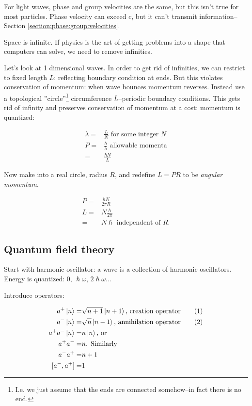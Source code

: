 \documentclass[]{article}
\newcommand\numberthis{\addtocounter{equation}{1}\tag{\theequation}}
\begin{document}
For light waves, phase and group velocities are the same, but this isn't true for most particles. Phase velocity can exceed $c$, but it can't transmit information--Section \ref{section:phase:group:velocities}.

Space is infinite. If physics is the art of getting problems into a shape that computers can solve, we need to remove infinities.

Let's look at 1 dimensional waves. In order to get rid of infinities, we can restrict to fixed length $L$: reflecting boundary condition at ends. But this violates conservation of momentum: when wave bounces momentum reverses. Instead use a topological ''circle''\footnote{I.e. we just assume that the ends are connected somehow--in fact there is no end.} circumference $L$--periodic boundary conditions. This gets rid of infinity and preserves conservation of momentum at a cost: momentum is quantized: 

\begin{align*}
	\lambda =& \frac{L}{N} \text{ for some integer $N$}\\
	P =& \frac{h}{\lambda} \text{ allowable momenta}\\
	=& \frac{h N}{L}
\end{align*}

Now make into a real circle, radius $R$, and redefine $L=PR$ to be \emph{angular momentum}.

\begin{align*}
P =& \frac{h N}{2 \pi R}\\
L =& N \frac{h}{2 \pi}\\
=& N \hslash \text{ independent of $R$.}
\end{align*}

\subsection{Quantum field theory}

Start with harmonic oscillator: a wave is a collection of harmonic oscillators. Energy is quantized: 0, $\hslash \omega$, $2\hslash \omega$...

Introduce operators:

\begin{align*}
a^+ \ket{n} =& \sqrt{n+1} \ket{n+1} \text{, creation operator} \numberthis \label{eq:creation}\\
a^- \ket{n} =& \sqrt{n} \ket{n-1} \text{, annihilation operator} \numberthis \label{eq:annihilation} \\
a^+ a^- \ket{n} =& n \ket{n} \text{, or}\\
a^+ a^-  =& n \text{. Similarly}\\
a^- a^+  =& n+1\\
[a^-, a^+] =& 1
\end{align*}
\end{document}
